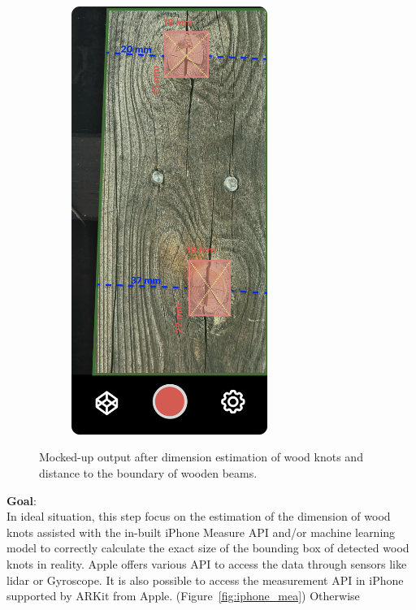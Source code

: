 \begin{figure}[ht]
\begin{subfigure}[b]{0.3\textwidth}
        \includegraphics[width=0.7\textwidth]{Master Thesis/Images/Section_3/Mock/3-Mock5.png}
    \end{subfigure}
  \caption{Mocked-up output after dimension estimation of wood knots and distance to the boundary of wooden beams.}   
    \label{fig:mock3}
\end{figure}  


\textbf{Goal}:\\

In ideal situation, this step focus on the estimation of the dimension of wood knots assisted with the in-built iPhone Measure API and/or machine learning model to correctly calculate the exact size of the bounding box of detected wood knots in reality. Apple offers various API to access the data through sensors like lidar or Gyroscope. It is also possible to access the measurement API in iPhone supported by ARKit from Apple. (Figure~\ref{fig:iphone_mea}) Otherwise


